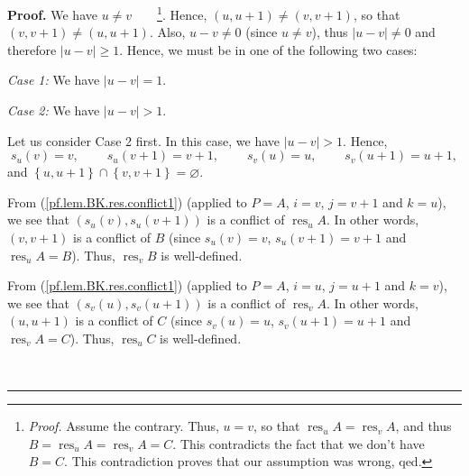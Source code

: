 \documentclass[numbers=enddot,12pt,final,onecolumn,notitlepage]{scrartcl}%
\theoremstyle{definition}
\newenvironment{proof}[1][Proof]{\noindent\textbf{#1.} }{\ \rule{0.5em}{0.5em}}
\newenvironment{verlong}{}{}
\begin{document}
\begin{verlong}
\begin{proof}
We have $u\neq v$\ \ \ \ \footnote{\textit{Proof.} Assume the contrary. Thus,
$u=v$, so that $\operatorname*{res}\nolimits_{u}A=\operatorname*{res}%
\nolimits_{v}A$, and thus $B=\operatorname*{res}\nolimits_{u}%
A=\operatorname*{res}\nolimits_{v}A=C$. This contradicts the fact that we
don't have $B=C$. This contradiction proves that our assumption was wrong,
qed.}. Hence, $\left(  u,u+1\right)  \neq\left(  v,v+1\right)  $, so that
$\left(  v,v+1\right)  \neq\left(  u,u+1\right)  $. Also, $u-v\neq0$ (since
$u\neq v$), thus $\left\vert u-v\right\vert \neq0$ and therefore $\left\vert
u-v\right\vert \geq1$. Hence, we must be in one of the following two cases:

\textit{Case 1:} We have $\left\vert u-v\right\vert =1$.

\textit{Case 2:} We have $\left\vert u-v\right\vert >1$.

Let us consider Case 2 first. In this case, we have $\left\vert u-v\right\vert
>1$. Hence,%
\[
s_{u}\left(  v\right)  =v,\ \ \ \ \ \ \ \ \ \ s_{u}\left(  v+1\right)
=v+1,\ \ \ \ \ \ \ \ \ \ s_{v}\left(  u\right)  =u,\ \ \ \ \ \ \ \ \ \ s_{v}%
\left(  u+1\right)  =u+1,
\]
and $\left\{  u,u+1\right\}  \cap\left\{  v,v+1\right\}  =\varnothing$.

From (\ref{pf.lem.BK.res.conflict1}) (applied to $P=A$, $i=v$, $j=v+1$ and
$k=u$), we see that $\left(  s_{u}\left(  v\right)  ,s_{u}\left(  v+1\right)
\right)  $ is a conflict of $\operatorname*{res}\nolimits_{u}A$. In other
words, $\left(  v,v+1\right)  $ is a conflict of $B$ (since $s_{u}\left(
v\right)  =v$, $s_{u}\left(  v+1\right)  =v+1$ and $\operatorname*{res}%
\nolimits_{u}A=B$). Thus, $\operatorname*{res}\nolimits_{v}B$ is well-defined.

From (\ref{pf.lem.BK.res.conflict1}) (applied to $P=A$, $i=u$, $j=u+1$ and
$k=v$), we see that $\left(  s_{v}\left(  u\right)  ,s_{v}\left(  u+1\right)
\right)  $ is a conflict of $\operatorname*{res}\nolimits_{v}A$. In other
words, $\left(  u,u+1\right)  $ is a conflict of $C$ (since $s_{v}\left(
u\right)  =u$, $s_{v}\left(  u+1\right)  =u+1$ and $\operatorname*{res}%
\nolimits_{v}A=C$). Thus, $\operatorname*{res}\nolimits_{u}C$ is well-defined.


\end{proof}
\end{verlong}
\end{document}
